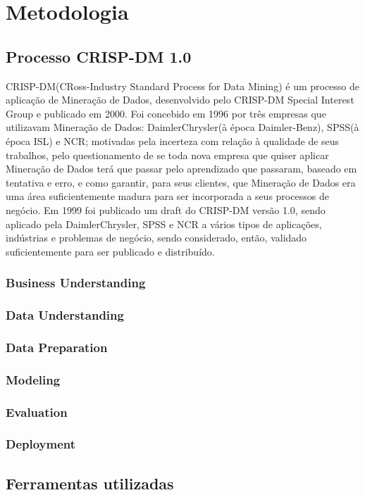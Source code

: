 \chapter{Metodologia}

\section{Processo CRISP-DM 1.0}
\cite{ML_know} \cite{balance-anarchy} \cite{ML_debt} \cite{replicability}

\cite{CRISP-DM-KDD-SEMMA}

CRISP-DM(CRoss-Industry Standard Process for Data Mining) é um processo de aplicação de Mineração de Dados, desenvolvido pelo CRISP-DM Special Interest Group e publicado em 2000. Foi concebido em 1996 por três empresas que utilizavam Mineração de Dados: DaimlerChrysler(à época Daimler-Benz), SPSS(à época ISL) e NCR; motivadas pela incerteza com relação à qualidade de seus trabalhos, pelo questionamento de se toda nova empresa que quiser aplicar Mineração de Dados terá que passar pelo aprendizado que passaram, baseado em tentativa e erro, e como garantir, para seus clientes, que Mineração de Dados era uma área suficientemente madura para ser incorporada a seus processos de negócio. Em 1999 foi publicado um draft do CRISP-DM versão 1.0, sendo aplicado pela DaimlerChrysler, SPSS e NCR a vários tipos de aplicações, indústrias e problemas de negócio, sendo considerado, então, validado suficientemente para ser publicado e distribuído\cite{CRISP-DM}.


\subsection*{Business Understanding}
\subsection*{Data Understanding}
\subsection*{Data Preparation}
\subsection*{Modeling}
\subsection*{Evaluation}
\subsection*{Deployment}

\section{Ferramentas utilizadas}